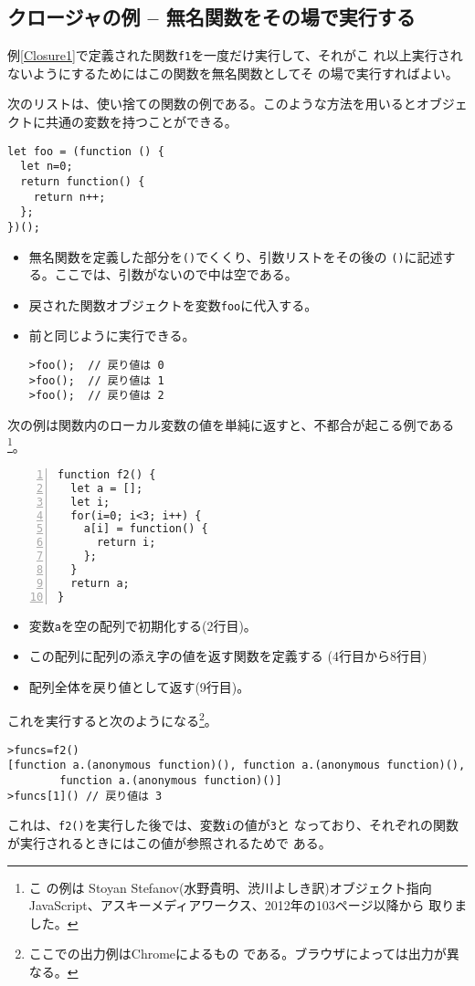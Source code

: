   \subsection{クロージャの例 -- 無名関数をその場で実行する}
 例\ref{Closure1}で定義された関数\texttt{f1}を一度だけ実行して、それがこ
				れ以上実行されないようにするためにはこの関数を無名関数としてそ
				の場で実行すればよい。
\begin{Exec}\upshape
  次のリストは、使い捨ての関数の例である。このような方法を用いるとオブジェ
    クトに共通の変数を持つことができる。
\begin{Verbatim}
let foo = (function () {
  let n=0;
  return function() {
    return n++;
  };
})();
\end{Verbatim}
\begin{itemize}
 \item 無名関数を定義した部分を\texttt{()}でくくり、引数リストをその後の
			 \texttt{()}に記述する。ここでは、引数がないので中は空である。
 	\item 戻された関数オブジェクトを変数\texttt{foo}に代入する。
	\item 前と同じように実行できる。
\begin{Verbatim}
>foo();  // 戻り値は 0
>foo();  // 戻り値は 1
>foo();  // 戻り値は 2
\end{Verbatim}
\end{itemize}
\end{Exec}
\begin{Exec}\upshape\label{functionsReturnLocalValue}
次の例は関数内のローカル変数の値を単純に返すと、不都合が起こる例である\footnote{こ
				の例は Stoyan Stefanov(水野貴明、渋川よしき訳)オブジェクト指向
				JavaScript、アスキーメディアワークス、2012年の103ページ以降から
 取りました。}。
\begin{Verbatim}[numbers=left]
function f2() {
  let a = [];
  let i;
  for(i=0; i<3; i++) {
    a[i] = function() {
      return i;
    };
  }
  return a;
}
\end{Verbatim}
 \begin{itemize}\upshape
	\item 変数\texttt{a}を空の配列で初期化する(2行目)。
	\item この配列に配列の添え字の値を返す関数を定義する
				(4行目から8行目)
	\item 配列全体を戻り値として返す(9行目)。
 \end{itemize}
 これを実行すると次のようになる\footnote{ここでの出力例はChromeによるもの
 である。ブラウザによっては出力が異なる。}。
\begin{Verbatim}
>funcs=f2()
[function a.(anonymous function)(), function a.(anonymous function)(),
		function a.(anonymous function)()]
>funcs[1]() // 戻り値は 3
\end{Verbatim}
 これは、\texttt{f2()}を実行した後では、変数\texttt{i}の値が\texttt{3}と
 なっており、それぞれの関数が実行されるときにはこの値が参照されるためで
 ある。
\end{Exec}
